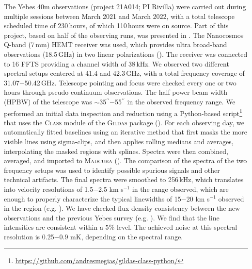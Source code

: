 \documentclass[twocolumn]{aastex63}
\begin{document}
The Yebes 40m observations (project 21A014; PI Rivilla) were carried out
during multiple sessions between March 2021 and March 2022, with a total telescope scheduled time of 230\,hours, of which 110\,hours were on source.
Part of this project, based on half of the observing runs, was presented in \citet{rivilla2022a,rivilla2022b}.
The Nanocosmos Q-band (7\,mm) HEMT receiver was used, which provides ultra broad-band observations (18.5\,GHz) in two linear polarizations (\citealt{tercero2021}). The receiver was connected to 16 FFTS providing a channel width of 38\,kHz. 
We observed two different spectral setups centered at 41.4 and 42.3\,GHz, with a total frequency coverage of 31.07$-$50.42\,GHz. 
Telescope pointing and focus were checked every one or two hours through pseudo-continuum observations.
The half power beam width (HPBW) of the telescope was $\sim$35$^{\prime\prime}$$-$55$^{\prime\prime}$ in the observed frequency range.
We performed an initial data inspection and reduction using a Python-based script\footnote{\url{https://github.com/andresmegias/gildas-class-python/}} that uses the \textsc{Class} module of the \textsc{Gildas} package (\citealt{megias2023}).
For each observing day, we automatically fitted baselines using an iterative method that first masks the more visible lines using sigma-clips, and then applies rolling medians and averages, interpolating the masked regions with splines. Spectra were then combined, averaged, and imported to \textsc{Madcuba} (\citealt{martin2019}).
The comparison of the spectra of the two frequency setups was used to identify possible spurious signals and other technical artifacts. 
The final spectra were smoothed to 256\,kHz, which translates into velocity resolutions of 1.5$-$2.5 km s$^{-1}$ in the range observed, which are enough to properly characterize the typical linewidths of 15$-$20 km s$^{-1}$ observed in the region (e.g. \citealt{requena-torres_organic_2006,zeng2018,rivilla2022c}).
We have checked flux density consistency between the new observations and the previous Yebes survey (e.g. \citealt{zeng2020,rodriguez-almeida2021a}). We find that the line intensities are consistent within a 5$\%$ level. The achieved noise at this spectral resolution is 0.25$-$0.9 mK, depending on the spectral range.
\end{document}
